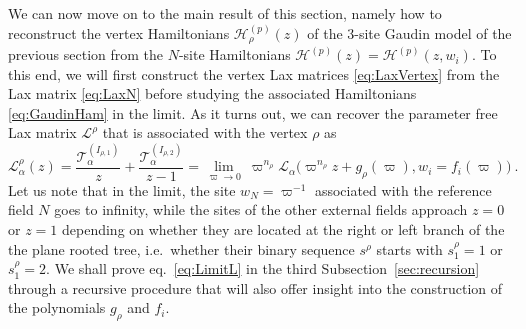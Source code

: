 \documentclass{article}
\def\Lc{\mathcal{L}}
\begin{document}
We can now move on to the main result of this section, namely how to reconstruct
the vertex Hamiltonians $\mathcal{H}^{(p)}_\rho(z)$ of the 3-site Gaudin model of the previous section from the $N$-site Hamiltonians $\mathcal{H}^{(p)}(z) =
\mathcal{H}^{(p)}(z,w_i)$. To this end, we will first construct the vertex Lax matrices
\eqref{eq:LaxVertex} from the Lax matrix \eqref{eq:LaxN} before studying the
associated Hamiltonians \eqref{eq:GaudinHam} in the limit. As it turns out, we 
can recover the parameter free Lax matrix $\Lc^\rho$ that is associated with  
the vertex $\rho$ as 
\begin{equation}\label{eq:LimitL}
\Lc_\alpha^\rho(z) = \frac{\mathcal{T}_\alpha^{(I_{\rho,1})}}{z} + 
\frac{\mathcal{T}_\alpha^{(I_{\rho,2})}}{z-1} = \lim_{\varpi \to 0}\  
\varpi^{n_\rho} \Lc_\alpha \bigl( \varpi^{n_\rho}z + g_\rho(\varpi), 
w_i = f_i(\varpi)\bigr)\ .
\end{equation}
Let us note that in the limit, the site $w_N= \varpi^{-1}$ associated with the reference 
field $N$ goes to infinity, while the sites of the other external fields approach $z=0$
or $z=1$ depending on whether they are located at the right or left branch of the the 
plane rooted tree, i.e.\ whether their binary sequence $s^\rho$ starts with $s^\rho_1 = 
1$ or $s^\rho_1 =2$. We shall prove eq.\ \eqref{eq:LimitL} in the third Subsection~\ref{sec:recursion} through 
a recursive procedure that will also offer insight into the construction of the polynomials
$g_\rho$ and $f_i$. 
\medskip 
\end{document}
